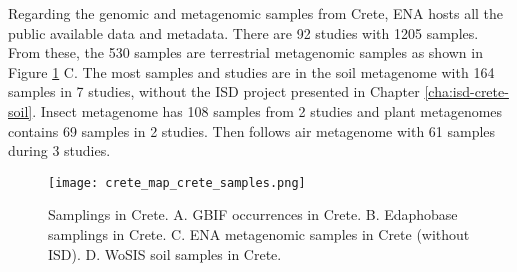 \begin{table}[]
\centering
\caption{Number of taxa per Phylum and IUCN redlist category about the terrestrial species of Crete.
    CR - Critically Endangered, EN - Endangered, VU - Vulnerable, NT - Near Threatened,
    LC - Least Concern, DD - Data Deficient.}
\label{table:crete_iucn_phyla}
\end{table}

Regarding the genomic and metagenomic samples from Crete, ENA hosts all the public 
available data and metadata. There are 92 studies with 1205 samples.
From these, the 530 samples are terrestrial metagenomic samples as shown in
Figure \ref{fig:crete-samplings} C. 
The most samples and studies are in the soil metagenome with 164 samples in 7 studies, without the
ISD project presented in Chapter \ref{cha:isd-crete-soil}.
Insect metagenome has 108 samples from 2 studies
and plant metagenomes contains 69 samples in 2 studies.
Then follows air metagenome with 61 samples during 3 studies.

\begin{figure}[!htb] 
    \centering\texttt{[image: crete\_map\_crete\_samples.png]}
    \caption[Samplings in Crete]{Samplings in Crete. A. GBIF occurrences in Crete.
    B. Edaphobase samplings in Crete. C. ENA metagenomic samples in Crete (without ISD). D. WoSIS soil samples in Crete.}
    \label{fig:crete-samplings}
\end{figure}

